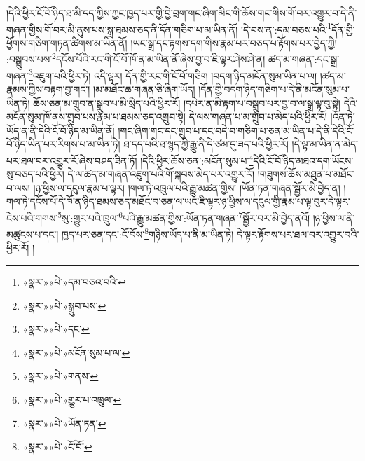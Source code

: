 །དེའི་ཕྱིར་ངོ་བོ་ཉིད་ཐ་མི་དད་ཀྱིས་ཀྱང་ཁྱད་པར་གྱི་བྱེ་བྲག་གང་ཞིག་མིང་གི་ཆོས་གང་གིས་གོ་བར་འགྱུར་བ་དེ་ནི་གཞན་གྱིས་གོ་བར་མི་ནུས་པས་སྒྲ་ཐམས་ཅད་ནི་དོན་གཅིག་པ་མ་ཡིན་ནོ། །དེ་བས་ན་:དམ་བཅས་པའི་\footnote{«སྣར་»«པེ་»དམ་བཅའ་བའི་}དོན་གྱི་ཕྱོགས་གཅིག་གཏན་ཚིགས་མ་ཡིན་ནོ། །ཡང་སྒྲ་དང་རྟགས་དག་གིས་རྣམ་པར་བཅད་པ་རྟོགས་པར་བྱེད་ཀྱི། :བསྒྲུབས་པས་\footnote{«སྣར་»«པེ་»སྒྲུབ་པས་}དངོས་པོའི་རང་གི་ངོ་བོ་ཁོ་ན་མ་ཡིན་ནོ་ཞེས་བྱ་བ་ཇི་ལྟར་ཤེས་ཤེ་ན། ཚད་མ་གཞན་:དང་སྒྲ་གཞན་\footnote{«སྣར་»«པེ་»དང་}འཇུག་པའི་ཕྱིར་ཏེ། འདི་ལྟར། དོན་གྱི་རང་གི་ངོ་བོ་གཅིག །བདག་ཉིད་མངོན་སུམ་ཡིན་པ་ལ། །ཚད་མ་རྣམས་ཀྱིས་བརྟག་བྱ་གང་། །མ་མཐོང་ཆ་གཞན་ཅི་ཞིག་ཡོད། །དོན་གྱི་བདག་ཉིད་གཅིག་པ་དེ་ནི་མངོན་སུམ་པ་ཡིན་ཏེ། ཆོས་ཅན་མ་གྲུབ་ན་སྒྲུབ་པ་མི་སྲིད་པའི་ཕྱིར་རོ། །དཔེར་ན་མི་རྟག་པ་བསྒྲུབ་པར་བྱ་བ་ལ་སྒྲ་ལྟ་བུ་སྟེ། དེའི་མངོན་སུམ་ཁོ་ནས་གྲུབ་པས་རྣམ་པ་ཐམས་ཅད་འགྲུབ་སྟེ། དེ་ལས་གཞན་པ་མ་གྲུབ་པ་མེད་པའི་ཕྱིར་རོ། །འོན་ཏེ་ཡོད་ན་ནི་དེའི་ངོ་བོ་ཉིད་མ་ཡིན་ནོ། །གང་ཞིག་གང་དང་གྲུབ་པ་དང་བདེ་བ་གཅིག་པ་ཅན་མ་ཡིན་པ་དེ་ནི་དེའི་ངོ་བོ་ཉིད་ཡིན་པར་རིགས་པ་མ་ཡིན་ཏེ། ཐ་དད་པའི་ཐ་སྙད་ཀྱི་རྒྱུ་ནི་དེ་ཙམ་དུ་ཟད་པའི་ཕྱིར་རོ། །དེ་ལྟ་མ་ཡིན་ན་མེད་པར་ཐལ་བར་འགྱུར་རོ་ཞེས་བཤད་ཟིན་ཏོ། །དེའི་ཕྱིར་ཆོས་ཅན་:མངོན་སུམ་པ་\footnote{«སྣར་»«པེ་»མངོན་སུམ་པ་ལ་}དེའི་ངོ་བོ་ཉིད་མཐའ་དག་ཡོངས་སུ་བཅད་པའི་ཕྱིར། དེ་ལ་ཚད་མ་གཞན་འཇུག་པའི་གོ་སྐབས་མེད་པར་འགྱུར་རོ། །གཟུགས་ཆོས་མཐུན་པ་མཐོང་བ་ལས། །ཉ་ཕྱིས་ལ་དངུལ་རྣམ་པ་ལྟར། །གལ་ཏེ་འཁྲུལ་པའི་རྒྱུ་མཚན་གྱིས། །ཡོན་ཏན་གཞན་སྦྱོར་མི་བྱེད་ན། །གལ་ཏེ་དངོས་པོ་དེ་ཁོ་ན་ཉིད་ཐམས་ཅད་མཐོང་བ་ཅན་ལ་ཡང་ཇི་ལྟར་ཉ་ཕྱིས་ལ་དངུལ་གྱི་རྣམ་པ་ལྟ་བུར་དེ་ལྟར་ངེས་པའི་གགས་\footnote{«སྣར་»«པེ་»གནས་}སུ་:གྱུར་པའི་ཁྲུལ་\footnote{«སྣར་»«པེ་»གྱུར་པ་འཁྲུལ་}པའི་རྒྱུ་མཚན་གྱིས་:ཡོན་ཏན་གཞན་\footnote{«སྣར་»«པེ་»ཡོན་ཏན་}སྦྱོར་བར་མི་བྱེད་ནའོ། །ཉ་ཕྱིས་ལ་ནི་མཚུངས་པ་དང་། ཁྱད་པར་ཅན་དང་:ངོ་བོས་\footnote{«སྣར་»«པེ་»ངོ་བོ་}གཉིས་ཡོད་པ་ནི་མ་ཡིན་ཏེ། དེ་ལྟར་རྟོགས་པར་ཐལ་བར་འགྱུར་བའི་ཕྱིར་རོ། །
